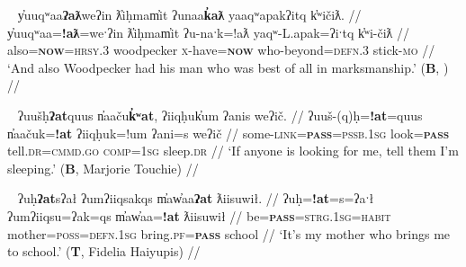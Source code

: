 \begin{comment}
\ex \label{ex:doubleatl2}
\begingl
\glpreamble ʔuḥʔaƛ tiic̓̌ap̓aƛ hałmiiḥa. //
\gla ʔuḥ=!aƛ tiic=!ap=!aƛ hałmiiḥa  //
\glb be=\textsc{now} alive.\textsc{dr}=\textsc{caus}=\textsc{now} drown.\textsc{cv} //
\glft `He made him alive from drowning.' (\textbf{C}, \textit{tupaat} Julia Lucas) //
\endgl
\xe
\end{comment}

\ex~ \label{ex:doubleatlyuuqwaa}
\begingl
\glpreamble y̓uuqʷaa\textbf{ʔaƛ}weʔin ƛ̓iḥmam̓it ʔunaa\textbf{k̓aƛ} yaaqʷapakʔitq k̓ʷičiƛ. //
\gla y̓uuqʷaa=\textbf{!aƛ}=weˑʔin ƛ̓iḥmam̓it ʔu-naˑk=!aƛ yaqʷ-L.apak=ʔiˑtq k̓ʷi-čiƛ  //
\glb also=\textbf{\textsc{now}}=\textsc{hrsy.3} woodpecker \textsc{x}-have=\textbf{\textsc{now}} who-beyond=\textsc{defn.3} stick-\textsc{mo} //
\glft `And also Woodpecker had his man who was best of all in marksmanship.' (\textbf{B}, \citealt[p.~50]{sapir1939}) //
\endgl
\xe


\begin{comment}
\ex~ \label{ex:doubleap}
\begingl
\glpreamble hišuk̓ap̓aƛ witkʷaaʔap ʔin wikmaḥsap̓aƛ, ḥaakʷaaƛsma. //
\gla hišuk=!ap=!aƛ witkʷaa=!ap ʔin wik-maḥsa=!ap=!aƛ, ḥaakʷaaƛ-sma  //
\glb all=\textsc{caus}=\textsc{now} destroy=\textsc{caus} \textsc{comp} \textsc{neg}-want.to=\textsc{caus}=\textsc{caus} young.woman-protective.of //
\glft `Everyone destroyed the wharf because they wanted her to marry, they were stingy of the girl.' (\textbf{C}, \textit{tupaat} Julia Lucas) //
\endgl
\xe
\end{comment}


\ex~ \label{ex:doubleatuush}
\begingl
\glpreamble ʔuušḥ\textbf{ʔat}quus n̓aaču\textbf{k̓ʷat}, ʔiiqḥuk̓um ʔanis weʔič. //
\gla ʔuuš-(q)ḥ=\textbf{!at}=quus n̓aačuk=\textbf{!at} ʔiiqḥuk=!um ʔani=s weʔič  //
\glb some-\textsc{link}=\textbf{\textsc{pass}}=\textsc{pssb.1sg} look=\textbf{\textsc{pass}} tell.\textsc{dr}=\textsc{cmmd.go} \textsc{comp}=\textsc{1sg} sleep.\textsc{dr} //
\glft `If anyone is looking for me, tell them I'm sleeping.' (\textbf{B}, Marjorie Touchie) //
\endgl
\xe

\ex~ \label{ex:doubleatuh}
\begingl
\glpreamble ʔuḥ\textbf{ʔat}sʔał ʔumʔiiqsakqs m̓aw̓aa\textbf{ʔat} ƛiisuwił. //
\gla ʔuḥ=\textbf{!at}=s=ʔaˑł ʔumʔiiqsu=ʔak=qs m̓aw̓aa=\textbf{!at} ƛiisuwił  //
\glb be=\textbf{\textsc{pass}}=\textsc{strg.1sg}=\textsc{habit} mother=\textsc{poss}=\textsc{defn.1sg} bring.\textsc{pf}=\textbf{\textsc{pass}} school //
\glft `It's my mother who brings me to school.' (\textbf{T}, Fidelia Haiyupis) //
\endgl
\xe

